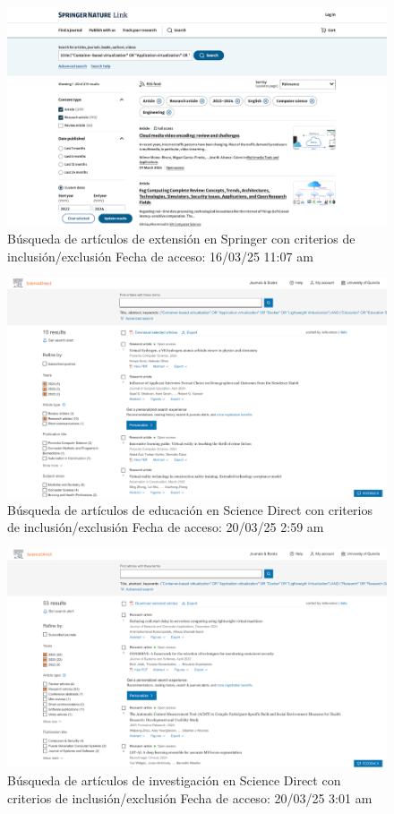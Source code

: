 \FloatBarrier\begin{figure}[H]
    \centering
    \includegraphics[width=\textwidth,keepaspectratio]{apendices/BD/criterios/Springer-ind.png}
    \caption{Búsqueda de artículos de extensión en Springer con criterios de inclusión/exclusión
    Fecha de acceso: 16/03/25 11:07 am
    }
\end{figure}
\FloatBarrier\begin{figure}[H]
    \centering
    \includegraphics[width=\textwidth,keepaspectratio]{apendices/BD/criterios/SD-ed.png}
    \caption{Búsqueda de artículos de educación en Science Direct con criterios de inclusión/exclusión
    Fecha de acceso: 20/03/25 2:59 am
    }
\end{figure}
\FloatBarrier\begin{figure}[H]
    \centering
    \includegraphics[width=\textwidth,keepaspectratio]{apendices/BD/criterios/SD-inv.png}
    \caption{Búsqueda de artículos de investigación en Science Direct con criterios de inclusión/exclusión
    Fecha de acceso: 20/03/25 3:01 am
    }
\end{figure}
